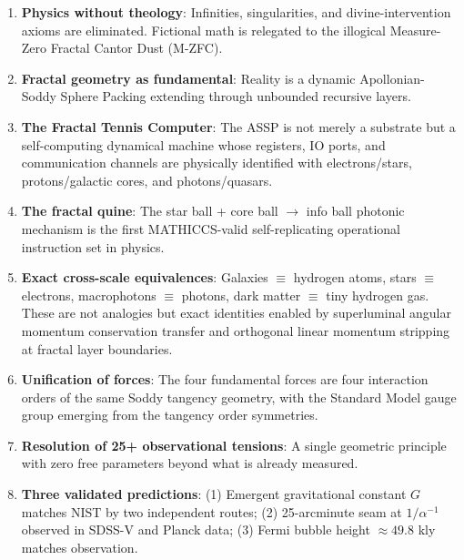 \documentclass[11pt,a4paper]{article}
\begin{document}
\begin{enumerate}

  \item \textbf{Physics without theology}: Infinities, singularities, and
        divine-intervention axioms are eliminated. Fictional math is relegated
        to the illogical Measure-Zero Fractal Cantor Dust (M-ZFC).

  \item \textbf{Fractal geometry as fundamental}: Reality is a dynamic
        Apollonian-Soddy Sphere Packing extending through unbounded recursive layers.

  \item \textbf{The Fractal Tennis Computer}: The ASSP is not merely a substrate
        but a self-computing dynamical machine whose registers, IO ports, and
        communication channels are physically identified with electrons/stars,
        protons/galactic cores, and photons/quasars.

  \item \textbf{The fractal quine}: The star ball + core ball $\to$ info ball
        photonic mechanism is the first MATHICCS-valid self-replicating operational
        instruction set in physics.

  \item \textbf{Exact cross-scale equivalences}: Galaxies $\equiv$ hydrogen atoms,
        stars $\equiv$ electrons, macrophotons $\equiv$ photons, dark matter $\equiv$
        tiny hydrogen gas. These are not analogies but exact identities enabled by
        superluminal angular momentum conservation transfer and orthogonal linear
        momentum stripping at fractal layer boundaries.

  \item \textbf{Unification of forces}: The four fundamental forces are four
        interaction orders of the same Soddy tangency geometry, with the Standard
        Model gauge group emerging from the tangency order symmetries.

  \item \textbf{Resolution of 25+ observational tensions}: A single geometric
        principle with zero free parameters beyond what is already measured.

  \item \textbf{Three validated predictions}: (1) Emergent gravitational constant $G$
        matches NIST by two independent routes; (2) 25-arcminute seam at
        $1/\alpha^{-1}$ observed in SDSS-V and Planck data; (3) Fermi bubble height
        $\approx49.8$ kly matches observation.


\end{enumerate}
\end{document}
